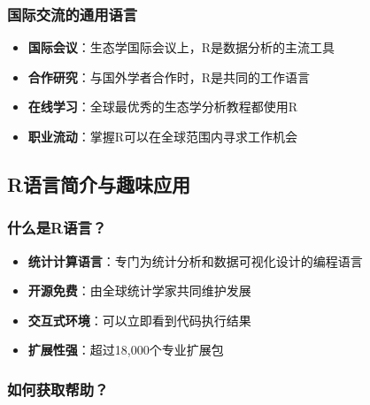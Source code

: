 \documentclass[
]{book}
\providecommand{\tightlist}{%
  \setlength{\itemsep}{0pt}\setlength{\parskip}{0pt}}
\begin{document}
\hypertarget{ux56fdux9645ux4ea4ux6d41ux7684ux901aux7528ux8bedux8a00}{%
\subsubsection{国际交流的通用语言}\label{ux56fdux9645ux4ea4ux6d41ux7684ux901aux7528ux8bedux8a00}}

\begin{itemize}
\tightlist
\item
  \textbf{国际会议}：生态学国际会议上，R是数据分析的主流工具
\item
  \textbf{合作研究}：与国外学者合作时，R是共同的工作语言
\item
  \textbf{在线学习}：全球最优秀的生态学分析教程都使用R
\item
  \textbf{职业流动}：掌握R可以在全球范围内寻求工作机会
\end{itemize}

\hypertarget{rux8bedux8a00ux7b80ux4ecbux4e0eux8da3ux5473ux5e94ux7528}{%
\subsection{R语言简介与趣味应用}\label{rux8bedux8a00ux7b80ux4ecbux4e0eux8da3ux5473ux5e94ux7528}}

\hypertarget{ux4ec0ux4e48ux662frux8bedux8a00}{%
\subsubsection{什么是R语言？}\label{ux4ec0ux4e48ux662frux8bedux8a00}}

\begin{itemize}
\tightlist
\item
  \textbf{统计计算语言}：专门为统计分析和数据可视化设计的编程语言
\item
  \textbf{开源免费}：由全球统计学家共同维护发展
\item
  \textbf{交互式环境}：可以立即看到代码执行结果
\item
  \textbf{扩展性强}：超过18,000个专业扩展包
\end{itemize}

\hypertarget{ux5982ux4f55ux83b7ux53d6ux5e2eux52a9}{%
\subsubsection{如何获取帮助？}\label{ux5982ux4f55ux83b7ux53d6ux5e2eux52a9}}
\end{document}
